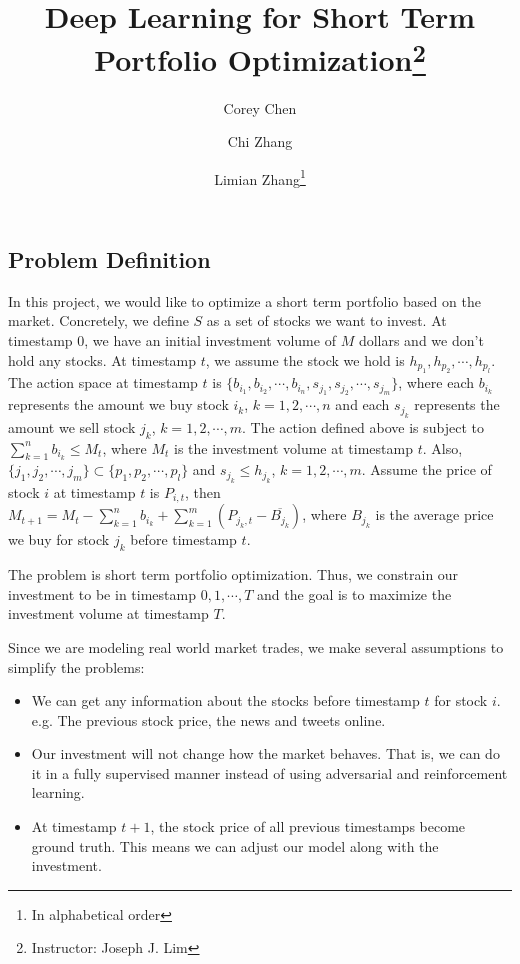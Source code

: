 \documentclass[a4paper, 10pt, twocolumn]{article}
\title{\textbf{Deep Learning for Short Term Portfolio Optimization}\thanks{Instructor: Joseph J. Lim}}
\author[]{Corey Chen}
\author[]{Chi Zhang}
\author[]{Limian Zhang\footnote{In alphabetical order}}
\affil[]{Department of Computer Science}
\begin{document}
  \maketitle                     %
  \begin{spacing}{1}
    \section{Problem Definition}
    In this project, we would like to optimize a short term portfolio based on the market. Concretely, we define $S$ as a set of stocks we want to invest. At timestamp 0, we have an initial investment volume of $M$ dollars and we don't hold any stocks. At timestamp $t$, we assume the stock we hold is $h_{p_1}, h_{p_2}, \cdots, h_{p_l}$. The action space at timestamp $t$ is $\{b_{i_1}, b_{i_2},\cdots, b_{i_n}, s_{j_1}, s_{j_2}, \cdots, s_{j_m}\}$, where each $b_{i_k}$ represents the amount we buy stock $i_k$, $k=1, 2, \cdots, n$ and each $s_{j_k}$ represents the amount we sell stock $j_k$, $k=1, 2, \cdots, m$. The action defined above is subject to $\sum_{k=1}^{n}b_{i_k}\leq M_t$, where $M_t$ is the investment volume at timestamp $t$. Also, $\{j_1, j_2, \cdots, j_m\}\subset\{p_1, p_2, \cdots, p_l\}$ and $s_{j_k}\leq h_{j_k}$, $k=1, 2, \cdots, m$. Assume the price of stock $i$ at timestamp $t$ is $P_{i, t}$, then $M_{t+1} = M_{t} - \sum_{k=1}^{n}b_{i_k} + \sum_{k=1}^{m}(P_{j_k, t} - \overline{B_{j_k}})$, where $B_{j_k}$ is the average price we buy for stock $j_k$ before timestamp $t$. 
    
    The problem is short term portfolio optimization. Thus, we constrain our investment to be in timestamp $0, 1, \cdots, T$ and the goal is to maximize the investment volume at timestamp $T$.
    
    Since we are modeling real world market trades, we make several assumptions to simplify the problems:
    \begin{itemize}
      \item We can get any information about the stocks before timestamp $t$ for stock $i$. e.g. The previous stock price, the news and tweets online.
      \item Our investment will not change how the market behaves. That is, we can do it in a fully supervised manner instead of using adversarial and reinforcement learning.
      \item At timestamp $t+1$, the stock price of all previous timestamps become ground truth. This means we can adjust our model along with the investment.
    \end{itemize}
    

\end{spacing}
\end{document}
